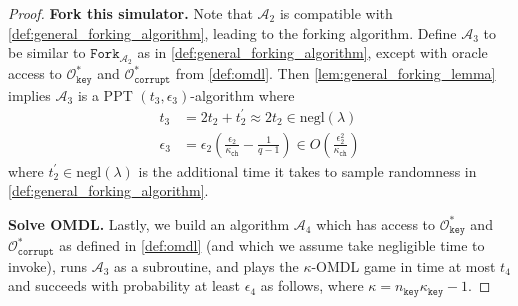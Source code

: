 \documentclass[11pt]{article}
\theoremstyle{definition}
\newcommand{\secpar}{\lambda}
\newcommand{\negl}{\text{negl}(\secpar)}
\newcommand{\corruptionOracle}{\mathcal{O}_{\texttt{corrupt}}}
\newcommand{\keyOracle}{\mathcal{O}_{\texttt{key}}}
\begin{document}
\begin{proof}
\textbf{Fork this simulator.} 
Note that $\mathcal{A}_2$ is compatible with \cref{def:general_forking_algorithm}, leading to the forking algorithm.
Define $\mathcal{A}_3$ to be similar to $\texttt{Fork}_{\mathcal{A}_2}$ as in 
\cref{def:general_forking_algorithm}, except with oracle access to $\keyOracle^*$ and $\corruptionOracle^*$ from \cref{def:omdl}. Then \cref{lem:general_forking_lemma} implies $\mathcal{A}_3$ is a PPT $(t_3, \epsilon_3)$-algorithm where
\begin{align*}
t_3  &= 2t_2+t_2^\prime \approx 2t_2 \in \negl \\
 \epsilon_3 &= \epsilon_2\left(\frac{\epsilon_2}{\kappa_{\texttt{ch}}} - \frac{1}{q-1}\right) \in O\left(\frac{\epsilon_2^2}{\kappa_{\texttt{ch}}}\right)
\end{align*} where $t_2^\prime \in \negl$ is the additional time it takes to sample randomness in \cref{def:general_forking_algorithm}. 

\textbf{Solve OMDL.} Lastly, we build an algorithm $\mathcal{A}_4$ which has access to $\keyOracle^*$ and $\corruptionOracle^*$ as defined in \cref{def:omdl} (and which we assume take negligible time to invoke), runs $\mathcal{A}_3$ as a subroutine, and plays the $\kappa$-OMDL game in time at most $t_4$ and succeeds with probability at least $\epsilon_4$ as follows, where $\kappa =n_{\texttt{key}}\kappa_{\texttt{key}} - 1$.


\end{proof}
\end{document}
